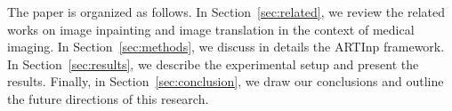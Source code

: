 The paper is organized as follows. In Section~\ref{sec:related}, we review the related works on image inpainting and image translation in the context of medical imaging. In Section~\ref{sec:methods}, we discuss in details the ARTInp framework. In Section~\ref{sec:results}, we describe the experimental setup and present the results. Finally, in Section~\ref{sec:conclusion}, we draw our conclusions and outline the future directions of this research.

